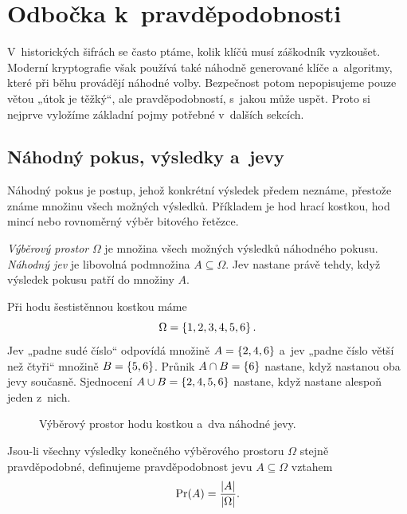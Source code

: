 \section{Odbočka k~pravděpodobnosti}\label{sec:krypto-pravdepodobnost}

V~historických šifrách se často ptáme, kolik klíčů musí záškodník vyzkoušet. Moderní kryptografie však používá také náhodně generované klíče a~algoritmy, které při běhu provádějí náhodné volby. Bezpečnost potom nepopisujeme pouze větou „útok je těžký“, ale pravděpodobností, s~jakou může uspět. Proto si nejprve vyložíme základní pojmy potřebné v~dalších sekcích.

\subsection{Náhodný pokus, výsledky a~jevy}

Náhodný pokus je postup, jehož konkrétní výsledek předem neznáme, přestože známe množinu všech možných výsledků. Příkladem je hod hrací kostkou, hod mincí nebo rovnoměrný výběr bitového řetězce.

\begin{definition}
    \emph{Výběrový prostor} $\Omega$ je množina všech možných výsledků náhodného pokusu. \emph{Náhodný jev} je libovolná podmnožina $A\subseteq\Omega$. Jev nastane právě tehdy, když výsledek pokusu patří do množiny $A$.
\end{definition}

Při hodu šestistěnnou kostkou máme
\[
    \Omega=\left\{1,2,3,4,5,6\right\}.
\]
Jev „padne sudé číslo“ odpovídá množině $A=\left\{2,4,6\right\}$ a~jev „padne číslo větší než čtyři“ množině $B=\left\{5,6\right\}$. Průnik $A\cap B=\left\{6\right\}$ nastane, když nastanou oba jevy současně. Sjednocení $A\cup B=\left\{2,4,5,6\right\}$ nastane, když nastane alespoň jeden z~nich.

\begin{figure}[ht]
    \centering
    
    \caption{Výběrový prostor hodu kostkou a~dva náhodné jevy.}
    \label{fig:krypto-pravdepodobnost-prostor}
\end{figure}

\begin{definition}
    Jsou-li všechny výsledky konečného výběrového prostoru $\Omega$ stejně pravděpodobné, definujeme pravděpodobnost jevu $A\subseteq\Omega$ vztahem
    \[
        \Pr(A)=\frac{\left| A \right|}{\left| \Omega \right|}.
    \]
\end{definition}

